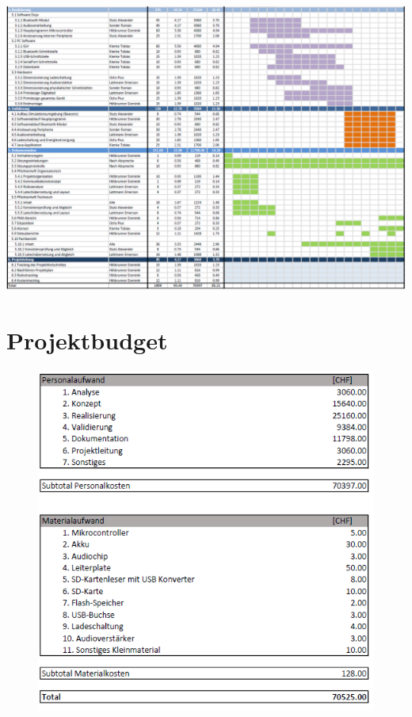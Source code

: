 \documentclass[10pt,a4paper,oneside]{99_fhnwreport}
\begin{document}
\begin{landscape}
\hspace*{-0.6cm}
\vspace*{2cm}
\includegraphics[height=\dimexpr\textheight-4\baselineskip\relax,page=1]{projektplan_2.pdf}
\end{landscape}
\newpage

\section{Projektbudget}\label{sec:projektbudget}

\begin{figure}[htbp]
	\centering
	\includegraphics[width=13.5cm]{Projektbudget.png}
\end{figure}
\end{document}
